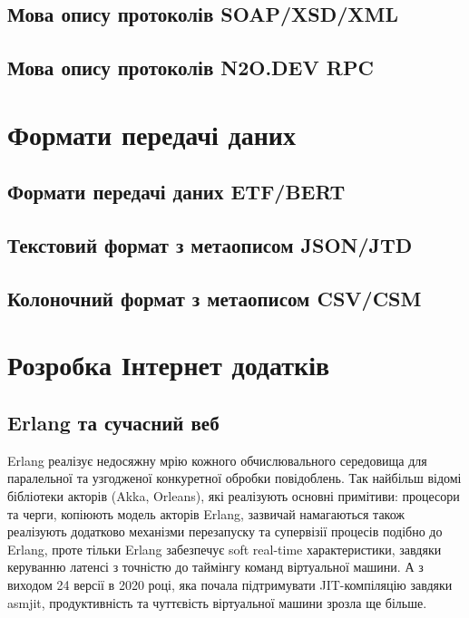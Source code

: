 \subsection{Мова опису протоколів SOAP/XSD/XML}

\subsection{Мова опису протоколів N2O.DEV RPC}

\section{Формати передачі даних}

\subsection{Формати передачі даних ETF/BERT}

\subsection{Текстовий формат з метаописом JSON/JTD}

\subsection{Колоночний формат з метаописом CSV/CSM}

\section{Розробка Інтернет додатків}

\subsection{Erlang та сучасний веб}

Erlang реалізує недосяжну мрію кожного обчислювального середовища для
паралельної та узгодженої конкуретної обробки повідоблень. Так найбільш
відомі бібліотеки акторів (Akka, Orleans), які реалізують основні примітиви:
процесори та черги, копіюють модель акторів Erlang, зазвичай намагаються
також реалізують додатково механізми перезапуску та супервізії процесів
подібно до Erlang, проте тільки Erlang забезпечує soft real-time характеристики,
завдяки керуванню латенсі з точністю до таймінгу команд віртуальної машини.
А з виходом 24 версії в 2020 році, яка почала підтримувати JIT-компіляцію
завдяки asmjit, продуктивність та чуттєвість віртуальної машини зрозла
ще більше.

